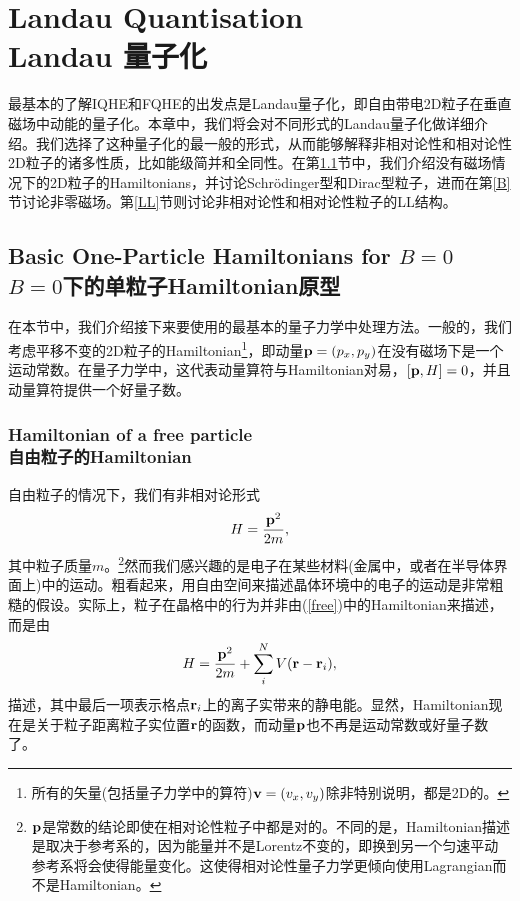 \documentclass[10pt]{book}
\newcommand{\bp}{{\bf p}}
\newcommand{\br}{{\bf r}}
\newcommand{\beq}{\begin{equation}}
\newcommand{\eeq}{\end{equation}}
\begin{document}
\chapter[Landau 量子化]{Landau Quantisation\\\bf Landau 量子化}
\label{Landau}


最基本的了解IQHE和FQHE的出发点是Landau量子化，即自由带电2D粒子在垂直磁场中动能的量子化。本章中，我们将会对不同形式的Landau量子化做详细介绍。我们选择了这种量子化的最一般的形式，从而能够解释非相对论性和相对论性2D粒子的诸多性质，比如能级简并和全同性。在第\ref{zeroB}节中，我们介绍没有磁场情况下的2D粒子的Hamiltonians，并讨论Schr\"odinger型和Dirac型粒子，进而在第\ref{B}节讨论非零磁场。第\ref{LL}节则讨论非相对论性和相对论性粒子的LL结构。


\section[$B=0$下的单粒子Hamiltonian原型]{Basic One-Particle Hamiltonians for $B=0$\\\bf $B=0$下的单粒子Hamiltonian原型}
\label{zeroB}


在本节中，我们介绍接下来要使用的最基本的量子力学中处理方法。一般的，我们考虑平移不变的2D粒子的Hamiltonian\footnote{所有的矢量(包括量子力学中的算符)${\bf v}=(v_x,v_y)$除非特别说明，都是2D的。}，即动量$\bp=(p_x,p_y)$在没有磁场下是一个运动常数。在量子力学中，这代表动量算符与Hamiltonian对易，$[\bp,H]=0$，并且动量算符提供一个好量子数。




\subsection[自由粒子的Hamiltonian]{Hamiltonian of a free particle\\\bf 自由粒子的Hamiltonian}

自由粒子的情况下，我们有非相对论形式
\beq\label{free}
H = \frac{\bp^2}{2m},
\eeq
其中粒子质量$m$。\footnote{$\bp$是常数的结论即使在相对论性粒子中都是对的。不同的是，Hamiltonian描述是取决于参考系的，因为能量并不是Lorentz不变的，即换到另一个匀速平动参考系将会使得能量变化。这使得相对论性量子力学更倾向使用Lagrangian而不是Hamiltonian。}然而我们感兴趣的是电子在某些材料(金属中，或者在半导体界面上)中的运动。粗看起来，用自由空间来描述晶体环境中的电子的运动是非常粗糙的假设。实际上，粒子在晶格中的行为并非由(\ref{free})中的Hamiltonian来描述，而是由
\beq\label{LatticeHam}
H=\frac{\bp^2}{2m} + \sum_i^N V(\br-\br_i),
\eeq
描述，其中最后一项表示格点$\br_i$上的离子实带来的静电能。显然，Hamiltonian现在是关于粒子距离粒子实位置$\br$的函数，而动量$\bp$也不再是运动常数或好量子数了。
\end{document}
